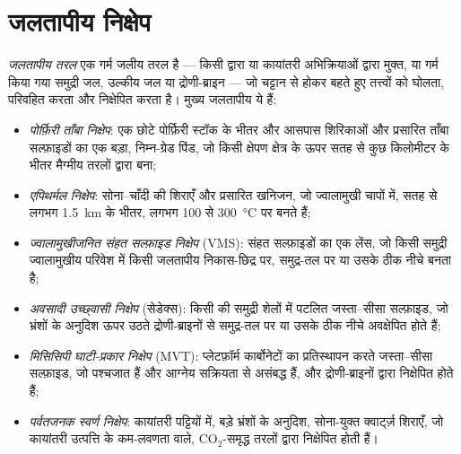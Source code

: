 \section{जलतापीय निक्षेप}\label{sec:b2:ore-deposits:hydrothermal}

\begin{definition}\label{def:b2:ore-deposits:hydrothermal}
\emph{जलतापीय तरल} एक गर्म जलीय तरल है --- किसी  द्वारा या कायांतरी अभिक्रियाओं द्वारा
मुक्त, या गर्म किया गया समुद्री जल, उल्कीय जल या द्रोणी-ब्राइन --- जो चट्टान से होकर बहते हुए तत्त्वों को
घोलता, परिवहित करता और निक्षेपित करता है। मुख्य जलतापीय 
ये हैं:
\begin{itemize}
  \item \emph{पोर्फ़िरी ताँबा निक्षेप}: एक छोटे पोर्फ़िरी स्टॉक के भीतर और
        आसपास शिरिकाओं और प्रसारित ताँबा सल्फ़ाइडों का एक बड़ा, निम्न-ग्रेड पिंड, जो किसी क्षेपण क्षेत्र के
        ऊपर सतह से कुछ किलोमीटर के भीतर मैग्मीय तरलों द्वारा बना;
  \item \emph{एपिथर्मल निक्षेप}: सोना--चाँदी की शिराएँ और प्रसारित खनिजन,
        जो ज्वालामुखी चापों में, सतह से लगभग \qty{1.5}{km} के भीतर, लगभग 100 से
        \qty{300}{\celsius} पर बनते हैं;
  \item \emph{ज्वालामुखीजनित संहत सल्फ़ाइड निक्षेप}
        (VMS): संहत सल्फ़ाइडों का एक लेंस, जो किसी समुद्री ज्वालामुखीय परिवेश में किसी जलतापीय
        निकास-छिद्र पर, समुद्र-तल पर या उसके ठीक नीचे बनता है;
  \item \emph{अवसादी उच्छ्वासी निक्षेप} (सेडेक्स):
        किसी  की समुद्री शेलों में पटलित जस्ता--सीसा सल्फ़ाइड, जो भ्रंशों के अनुदिश ऊपर उठते
        द्रोणी-ब्राइनों से समुद्र-तल पर या उसके ठीक नीचे अवक्षेपित होते हैं;
  \item \emph{मिसिसिपी घाटी-प्रकार निक्षेप} (MVT):
        प्लेटफ़ॉर्म कार्बोनेटों का प्रतिस्थापन करते जस्ता--सीसा सल्फ़ाइड, जो पश्चजात हैं और आग्नेय
        सक्रियता से असंबद्ध हैं, और द्रोणी-ब्राइनों द्वारा निक्षेपित होते हैं;
  \item \emph{पर्वतजनक स्वर्ण निक्षेप}: कायांतरी पट्टियों में, बड़े भ्रंशों के
        अनुदिश, सोना-युक्त क्वार्ट्ज़ शिराएँ, जो कायांतरी उत्पत्ति के कम-लवणता वाले, CO$_2$-समृद्ध तरलों
        द्वारा निक्षेपित होती हैं।
\end{itemize}
\end{definition}

